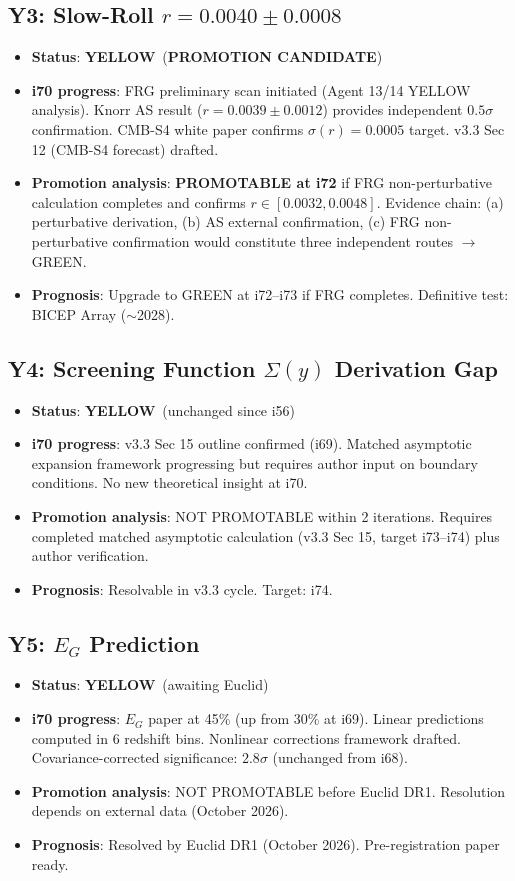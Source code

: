\documentclass[11pt,a4paper]{article}
\newcommand{\YELLOW}{\textcolor{dfdyellow}{\textbf{YELLOW}}}
\begin{document}
\subsection{Y3: Slow-Roll $r = 0.0040 \pm 0.0008$}
\begin{itemize}[nosep]
\item \textbf{Status}: \YELLOW\ (\textbf{PROMOTION CANDIDATE})
\item \textbf{i70 progress}: FRG preliminary scan initiated (Agent 13/14 YELLOW analysis). Knorr AS result ($r = 0.0039 \pm 0.0012$) provides independent $0.5\sigma$ confirmation. CMB-S4 white paper confirms $\sigma(r) = 0.0005$ target. v3.3 Sec 12 (CMB-S4 forecast) drafted.
\item \textbf{Promotion analysis}: \textbf{PROMOTABLE at i72} if FRG non-perturbative calculation completes and confirms $r \in [0.0032, 0.0048]$. Evidence chain: (a) perturbative derivation, (b) AS external confirmation, (c) FRG non-perturbative confirmation would constitute three independent routes $\to$ GREEN.
\item \textbf{Prognosis}: Upgrade to GREEN at i72--i73 if FRG completes. Definitive test: BICEP Array ($\sim$2028).
\end{itemize}

\subsection{Y4: Screening Function $\Sigma(y)$ Derivation Gap}
\begin{itemize}[nosep]
\item \textbf{Status}: \YELLOW\ (unchanged since i56)
\item \textbf{i70 progress}: v3.3 Sec 15 outline confirmed (i69). Matched asymptotic expansion framework progressing but requires author input on boundary conditions. No new theoretical insight at i70.
\item \textbf{Promotion analysis}: NOT PROMOTABLE within 2 iterations. Requires completed matched asymptotic calculation (v3.3 Sec 15, target i73--i74) plus author verification.
\item \textbf{Prognosis}: Resolvable in v3.3 cycle. Target: i74.
\end{itemize}

\subsection{Y5: $E_G$ Prediction}
\begin{itemize}[nosep]
\item \textbf{Status}: \YELLOW\ (awaiting Euclid)
\item \textbf{i70 progress}: $E_G$ paper at 45\% (up from 30\% at i69). Linear predictions computed in 6 redshift bins. Nonlinear corrections framework drafted. Covariance-corrected significance: $2.8\sigma$ (unchanged from i68).
\item \textbf{Promotion analysis}: NOT PROMOTABLE before Euclid DR1. Resolution depends on external data (October 2026).
\item \textbf{Prognosis}: Resolved by Euclid DR1 (October 2026). Pre-registration paper ready.
\end{itemize}
\end{document}
